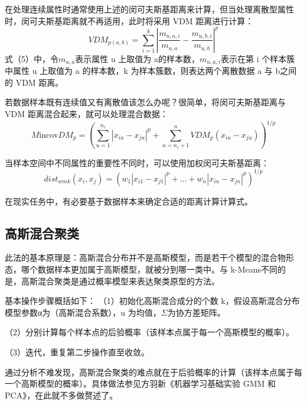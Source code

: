 在处理连续属性时通常使用上述的闵可夫斯基距离来计算，但当处理离散型属性时，闵可夫斯基距离就不再适用，此时将采用 VDM 距离进行计算：
\begin{equation}VDM_{p(a,b)}=\sum_{i=1}^k\left|\frac{m_{u,a,i}}{m_{u,a}}-\frac{m_{u,b,i}}{m_{u,b}}\right|^p\end{equation}
式（5）中，令$m_{u,a}$表示属性 u 上取值为 a的样本数，$m_{u,a,i}$表示在第 i 个样本簇中属性 u 上取值为 a 的样本数，k 为样本簇数，则表达两个离散数据 a 与 b之间的 VDM 距离。

若数据样本既有连续值又有离散值该怎么办呢？很简单，将闵可夫斯基距离与 VDM 距离混合起来，就可以处理混合数据：
\begin{equation}M\text{incov}DM_p=(\sum_{u=1}^{n_c}\left|x_{iu}-x_{ju}\right|^p+\sum_{u=n_c+1}^nVDM_p(x_{iu}-x_{ju}))^{1/p}\end{equation}

当样本空间中不同属性的重要性不同时，可以使用加权闵可夫斯基距离：
\begin{equation}dist_{wmk}\left(x_i,x_j\right)=\left(w_1\left|x_{i1}-x_{j1}\right|^p+...+w_n\left|x_{in}-x_{jn}\right|^p\right)^{1/p}\end{equation}

在现实任务中，有必要基于数据样本来确定合适的距离计算计算式。
\subsection{高斯混合聚类}
此法的基本原理是：高斯混合分布并不是高斯模型，而是若干个模型的混合物形态，哪个数据样本更加属于高斯模型，就被分到哪一类中。与 k-Means不同的是，高斯混合聚类是通过概率模型来表达聚类原型的方法。

基本操作步骤概括如下：
（1）初始化高斯混合成分的个数 k，假设高斯混合分布模型参数α为（高斯混合系数），u 为均值，$\Sigma $为协方差矩阵。

（2）分别计算每个样本点的后验概率（该样本点属于每一个高斯模型的概率）。

（3）迭代，重复第二步操作直至收敛。

通过分析不难发现，高斯混合聚类的难点就在于后验概率的计算（该样本点属于每一个高斯模型的概率）。具体做法参见方羽新《机器学习基础实验 GMM 和 PCA》，在此就不多做赘述了。
